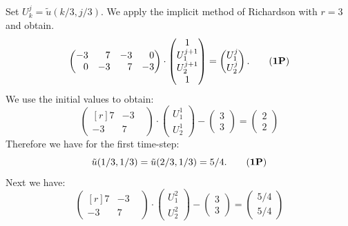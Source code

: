 \begin{loesung}
\begin{teilaufgaben}
\item
Set $U_k^{j} = \tilde u(k/3,j/3)$. We apply the implicit method
of Richardson with $r = 3$ and obtain. 
\begin{equation}
\begin{pmatrix*}[r]
-3 & 7 & -3 & 0 \\
0 & -3 & 7 & -3
\end{pmatrix*}
\cdot
\begin{pmatrix}
1 \\
U_1^{j+1} \\
U_2^{j+1} \\
1
\end{pmatrix}
=
\begin{pmatrix}
U_1^{j} \\
U_2^{j}
\end{pmatrix}.
\tag{\textbf{1P}}
\end{equation}
We use the initial values to obtain:
\[
\begin{pmatrix*}[r]  7 & -3 &  \\  -3 & 7 \end{pmatrix*}
\cdot
\begin{pmatrix} U_1^{1} \\  U_2^{1}  \end{pmatrix}
-
\begin{pmatrix} 3\\  3  \end{pmatrix}
=
\begin{pmatrix} 2 \\  2  \end{pmatrix}
\]
Therefore we have for the first time-step:
\begin{equation}
\tilde u(1/3,1/3) = \tilde u(2/3, 1/3) = 5/4.
\tag{\textbf{1P}}
\end{equation}
Next we have:
\[
\begin{pmatrix*}[r]  7 & -3 &  \\  -3 & 7 \end{pmatrix*}
\cdot
\begin{pmatrix} U_1^{2} \\  U_2^{2}  \end{pmatrix}
-
\begin{pmatrix} 3\\  3  \end{pmatrix}
=
\begin{pmatrix} 5/4 \\  5/4  \end{pmatrix}
\]
\end{teilaufgaben}
\end{loesung}
